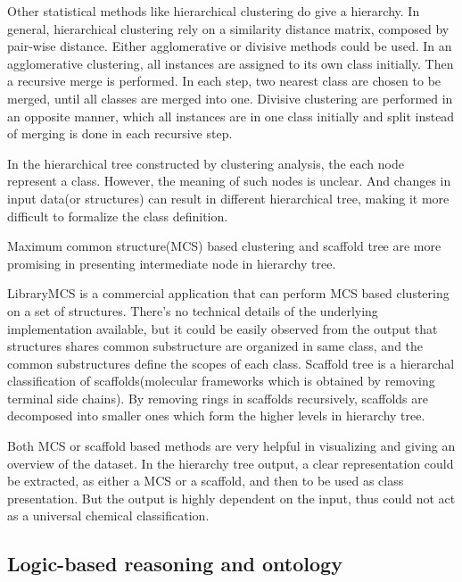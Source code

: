\documentclass[10pt]{bmc_article}
\newenvironment{bmcformat}{\baselineskip20pt\sloppy\setboolean{publ}{false}}{\baselineskip20pt\sloppy}
\begin{document}
\begin{bmcformat}
Other statistical methods like hierarchical clustering\cite{Adamson1981} do give a hierarchy. In general, hierarchical clustering rely on a similarity distance matrix, composed by pair-wise distance. Either agglomerative or divisive methods could be used. In an agglomerative clustering, all instances are assigned to its own class initially. Then a recursive merge is performed. In each step, two nearest class are chosen to be merged, until all classes are merged into one. Divisive clustering are performed in an opposite manner, which all instances are in one class initially and split instead of merging is done in each recursive step.

In the hierarchical tree constructed by clustering analysis, the each node represent a class. However, the meaning of such nodes is unclear. And changes in input data(or structures) can result in different hierarchical tree, making it more difficult to formalize the class definition. 

Maximum common structure(MCS) based clustering and scaffold tree are more promising in presenting intermediate node in hierarchy tree. 

LibraryMCS\cite{librarymcs} is a commercial application that can perform MCS based clustering on a set of structures. There's no technical details of the underlying implementation available, but it could be easily observed from the output that structures shares common substructure are organized in same class, and the common substructures define the scopes of each class. Scaffold tree\cite{Schuffenhauer2007} is a hierarchal classification of scaffolds(molecular frameworks which is obtained by removing terminal side chains). By removing rings in scaffolds recursively, scaffolds are decomposed into smaller ones which form the higher levels in hierarchy tree. 

Both MCS or scaffold based methods are very helpful in visualizing and giving an overview of the dataset. In the hierarchy tree output, a clear representation could be extracted, as either a MCS or a scaffold, and then to be used as class presentation. But the output is highly dependent on the input, thus could not act as a universal chemical classification. 


\subsection*{Logic-based reasoning and ontology}
\label{sec:backlogic}


\end{bmcformat}
\end{document}
